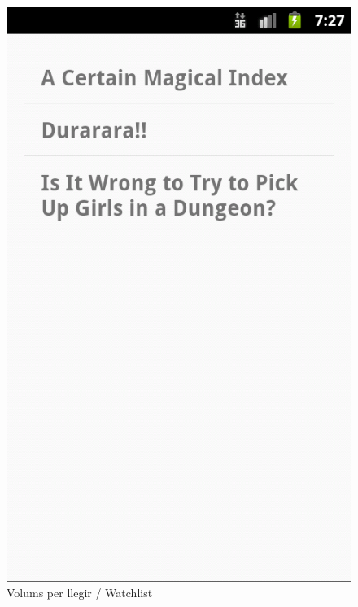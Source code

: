 \documentclass{beamer}
\begin{document}
\begin{frame}
\begin{figure}
			\includegraphics[scale=0.23]{watchlist.png}
			\caption{Volums per llegir / Watchlist}
		\end{figure}
	\end{frame}
\end{document}
